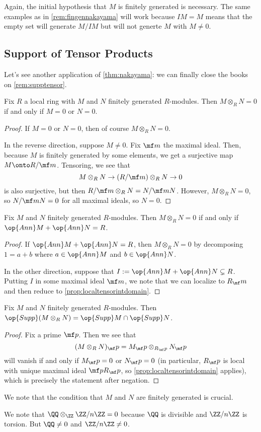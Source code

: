 \begin{remark}[Nir]
	Again, the initial hypothesis that $M$ is finitely generated is necessary. The same examples as in \autoref{rem:fingennakayama} will work because $IM=M$ means that the empty set will generate $M/IM$ but will not generte $M$ with $M\ne0$.
\end{remark}

\subsection{Support of Tensor Products}
Let's see another application of \autoref{thm:nakayama}: we can finally close the books on \autoref{rem:supptensor}.
\begin{proposition} \label{prop:localtensorintdomain}
	Fix $R$ a local ring with $M$ and $N$ finitely generated $R$-modules. Then $M\otimes_RN=0$ if and only if $M=0$ or $N=0$.
\end{proposition}
\begin{proof}
	If $M=0$ or $N=0$, then of course $M\otimes_RN=0$.
	
	In the reverse direction, suppose $M\ne0$. Fix $\mf m$ the maximal ideal. Then, because $M$ is finitely generated by some elements, we get a surjective map $M\onto R/\mf m$. Tensoring, we see that
	\[M\otimes_RN\to(R/\mf m)\otimes_RN\to0\]
	is also surjective, but then $R/\mf m\otimes_RN=N/\mf mN$. However, $M\otimes_RN=0$, so $N/\mf mN=0$ for all maximal ideals, so $N=0$.
\end{proof}
\begin{corollary}
	Fix $M$ and $N$ finitely generated $R$-modules. Then $M\otimes_RN=0$ if and only if $\op{Ann}M+\op{Ann}N=R$.
\end{corollary}
\begin{proof}
	If $\op{Ann}M+\op{Ann}N=R$, then $M\otimes_RN=0$ by decomposing $1=a+b$ where $a\in\op{Ann}M$ and $b\in\op{Ann}N$.

	In the other direction, suppose that $I:=\op{Ann}M+\op{Ann}N\subsetneq R$. Putting $I$ in some maximal ideal $\mf m$, we note that we can localize to $R_\mf m$ and then reduce to \autoref{prop:localtensorintdomain}.
\end{proof}
\begin{corollary}
	Fix $M$ and $N$ finitely generated $R$-modules. Then $\op{Supp}(M\otimes_RN)=\op{Supp}M\cap\op{Supp}N$.
\end{corollary}
\begin{proof}
	Fix a prime $\mf p$. Then we see that
	\[(M\otimes_RN)_\mf p=M_\mf p\otimes_{R_\mf p}N_\mf p\]
	will vanish if and only if $M_\mf p=0$ or $N_\mf p=0$ (in particular, $R_\mf p$ is local with unique maximal ideal $\mf pR_\mf p$, so \autoref{prop:localtensorintdomain} applies), which is precisely the statement after negation.
\end{proof}
We note that the condition that $M$ and $N$ are finitely generated is crucial.
\begin{nex}
	We note that $\QQ\otimes_\ZZ\ZZ/n\ZZ=0$ because $\QQ$ is divisible and $\ZZ/n\ZZ$ is torsion. But $\QQ\ne0$ and $\ZZ/n\ZZ\ne0$.
\end{nex}

